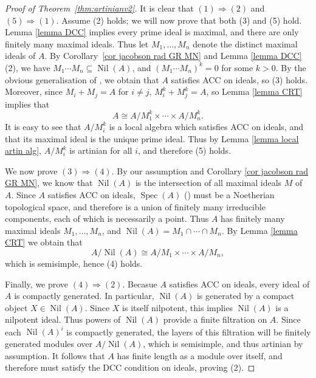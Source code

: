 \documentclass[11pt]{amsart}
\def\Spec{\operatorname{Spec}}
\def\sub{\subseteq}
\theoremstyle{definition}
\theoremstyle{remark}
\numberwithin{equation}{section}
\begin{document}
\begin{proof}[Proof of Theorem~\ref{thm:artinianv2}]
    It is clear that $(1)\Rightarrow(2)$ and $(5)\Rightarrow(1)$. Assume (2) holds; we will now prove that both (3) and (5) hold.  Lemma \ref{lemma DCC} implies every prime ideal is maximal, and there are only finitely many maximal ideals.  Thus let $M_1,\dots,M_n$ denote the distinct maximal ideals of $A$.  By Corollary~\ref{cor jacobson rad GR MN} and Lemma \ref{lemma DCC} (2), we have $M_1\cdots M_n\sub\operatorname{Nil}(A)$, and $(M_1\cdots M_n)^k=0$ for some $k>0$.  By the obvious generalisation of \cite[Cor.~6.11]{AM}, we obtain that $A$ satisfies ACC on ideals, so (3) holds.  Moreover, since $M_i+M_j=A$ for $i\neq j$, $M_i^k+M_j^k=A$, so Lemma \ref{lemma CRT} implies that
    \[
    A\cong A/M_1^k\times \cdots \times A/M_n^k.
    \]
    It is easy to see that $A/M_i^k$ is a local algebra which satisfies ACC on ideals, and that its maximal ideal is the unique prime ideal.  Thus by Lemma \ref{lemma local artin alg}, $A/M_i^k$ is artinian for all $i$, and therefore (5) holds.  
    
    We now prove $(3)\Rightarrow(4)$.  By our assumption and Corollary \ref{cor jacobson rad GR MN}, we know that $\operatorname{Nil}(A)$ is the intersection of all maximal ideals $M$ of $A$.  Since $A$ satisfies ACC on ideals, $\Spec(A)$ (\cite[\S2.2]{C1}) must be a Noetherian topological space, and therefore is a union of finitely many irreducible components, each of which is necessarily a point.  Thus $A$ has finitely many maximal ideals $M_1,\dots,M_n$, and $\operatorname{Nil}(A)=M_1\cap\cdots \cap M_n$.  By Lemma \ref{lemma CRT} we obtain that
    \[
    A/\operatorname{Nil}(A)\cong A/M_1\times\cdots\times A/M_n,
    \]
    which is semisimple, hence (4) holds.

    
     Finally, we prove $(4)\Rightarrow(2)$.  Becasue $A$ satisfies ACC on ideals, every ideal of $A$ is compactly generated.  In particular, $\operatorname{Nil}(A)$ is generated by a compact object $X\in\operatorname{Nil}(A)$.  Since $X$ is itself nilpotent, this implies $\operatorname{Nil}(A)$ is a nilpotent ideal.  Thus powers of $\operatorname{Nil}(A)$ provide a finite filtration on $A$.  Since each $\operatorname{Nil}(A)^i$ is compactly generated, the layers of this filtration will be finitely generated modules over $A/\operatorname{Nil}(A)$, which is semisimple, and thus artinian by assumption.  It follows that $A$ has finite length as a module over itself, and therefore must satisfy the DCC condition on ideals, proving (2). 
    \end{proof}
\end{document}
